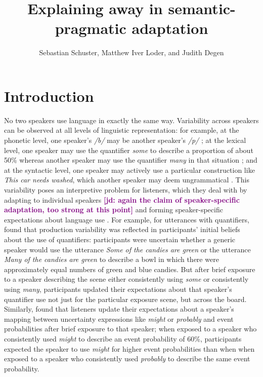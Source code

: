 \documentclass[man,floatsintext]{apa6}
\title{Explaining away in semantic-pragmatic adaptation}
\author{Sebastian Schuster, Matthew Iver Loder, and Judith Degen}
\affiliation{Department of Linguistics, Stanford University}
\newcommand{\jd}[1]{\textcolor{Purple}{\bf [jd: #1]}}
\begin{document}
\maketitle



\section{Introduction}

No two speakers use language in exactly the same way. Variability across speakers can be observed at all levels of linguistic representation: for example, at the phonetic level, one speaker's \emph{/b/} may be another speaker's \emph{/p/} \cite{Kleinschmidt2015}; at the lexical level, one speaker may use the  quantifier \textit{some} to describe a proportion of about 50\% whereas another speaker may use the quantifier \textit{many} in that situation \cite{Yildirim2016}; and at the syntactic level, one speaker may actively use a particular construction like \emph{This car needs washed}, which another speaker may deem ungrammatical \cite{Kaschak2004}. This variability poses an interpretive problem for listeners, which they deal with  by adapting to individual speakers \jd{again the claim of speaker-specific adaptation, too strong at this point} and forming speaker-specific expectations about language use \cite[inter alia]{Norris2003,Kraljic2005,Bradlow2008,Kurumada2012,Kamide2012,Kleinschmidt2015,Fine2016,Roettger2019}. For example, for utterances with quantifiers,   found that production variability was reflected in participants' initial beliefs about the use of quantifiers: participants were uncertain whether a generic speaker would use the utterance \textit{Some of the candies are green} or the utterance \textit{Many of the candies are green} to describe a bowl in which there were approximately equal numbers of green and blue candies. But after brief exposure to a speaker describing the scene either consistently using \textit{some} or consistently using \textit{many}, participants updated their expectations about that speaker's  quantifier use not just for the particular exposure scene, but across the board. Similarly,  found that listeners update their expectations about a speaker's mapping between uncertainty expressions like \textit{might} or \textit{probably} and event probabilities after brief exposure to that speaker; when exposed to a speaker who consistently used \textit{might} to describe an event probability of 60\%, participants expected the speaker to use \textit{might} for higher event probabilities than when when exposed to a speaker who consistently used \textit{probably} to describe the same event probability.
\end{document}
